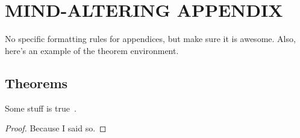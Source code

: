 \documentclass[english]{ucdenver-dissertation}
\begin{document}
\ucdappendix

\newpage
\chapter{MIND-ALTERING APPENDIX}

No specific formatting rules for appendices, but make sure it is awesome.  Also, here's an example of the theorem environment.

\section{Theorems}

\begin{theorem}

  Some stuff is true~\citep{article_2008}.

\end{theorem} 

\begin{proof}

Because I said so. 
\end{proof}
\end{document}
